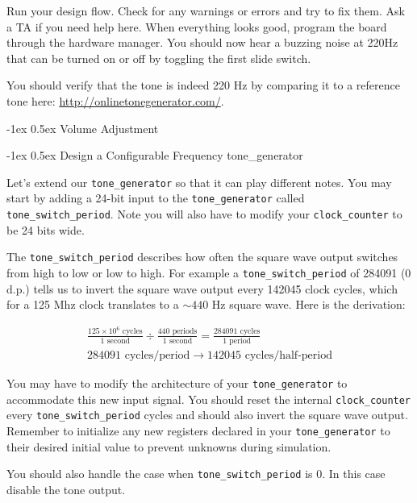 \documentclass[11pt]{article}
\makeatletter
\renewcommand{\subsection}
{\@startsection {subsection}{1}{0pt}
 {-1ex}
 {0.5ex}
 {\bfseries\normalsize}}
\makeatother
\begin{document}
Run your design flow. Check for any warnings or errors and try to fix them. Ask a TA if you need help here. When everything looks good, program the board through the hardware manager. You should now hear a buzzing noise at 220Hz that can be turned on or off by toggling the first slide switch.

You should verify that the tone is indeed 220 Hz by comparing it to a reference tone here: \url{http://onlinetonegenerator.com/}.

\subsection{Volume Adjustment}

\subsection{Design a Configurable Frequency tone\_generator}

Let's extend our \verb|tone_generator| so that it can play different notes. You may start by adding a 24-bit input to the \verb|tone_generator| called \verb|tone_switch_period|. Note you will also have to modify your \verb|clock_counter| to be 24 bits wide.

The \verb|tone_switch_period| describes how often the square wave output switches from high to low or low to high. For example a \verb|tone_switch_period| of 284091 (0 d.p.) tells us to invert the square wave output every 142045 clock cycles, which for a 125 Mhz clock translates to a $\sim 440$ Hz square wave. Here is the derivation:

\begin{eqnarray}
  \frac{125 \times 10^6 \text{ cycles}}{1 \text{ second}} \div \frac{440 \text{ periods}}{1 \text{ second}} = \frac{ 284091 \text{ cycles}}{1 \text{ period}} \nonumber \\
  284091 \text{ cycles/period} \rightarrow 142045 \text{ cycles/half-period} \nonumber
\end{eqnarray}

You may have to modify the architecture of your \verb|tone_generator| to accommodate this new input signal. You should reset the internal \verb|clock_counter| every \verb|tone_switch_period| cycles and should also invert the square wave output. Remember to initialize any new registers declared in your \verb|tone_generator| to their desired initial value to prevent unknowns during simulation.

You should also handle the case when \verb|tone_switch_period| is 0.  In this case disable the tone output.
\end{document}
